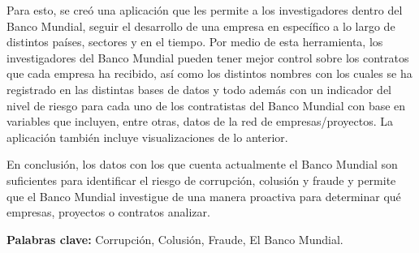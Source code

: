 Para esto, se creó una aplicación que les permite a los investigadores dentro del Banco Mundial, seguir el desarrollo de una empresa en específico a lo largo de distintos países, sectores y en el tiempo. Por medio de esta herramienta, los investigadores del Banco Mundial pueden tener mejor control sobre los contratos que cada empresa ha recibido, así como los distintos nombres con los cuales se ha registrado en las distintas bases de datos y todo además con  un indicador del nivel de riesgo para cada uno de los contratistas del Banco Mundial con base en variables que incluyen, entre otras, datos de la red de empresas/proyectos. La aplicación también incluye visualizaciones de lo anterior.

En conclusión, los datos con los que cuenta actualmente el Banco Mundial son suficientes para identificar el riesgo de corrupción, colusión y fraude y permite que el Banco Mundial investigue de una manera proactiva para determinar qué empresas, proyectos o contratos analizar.


\thispagestyle{plain}
\vfill
\scriptsize \noindent \textbf{Palabras clave:} Corrupción, Colusión, Fraude, El Banco Mundial.
\normalsize